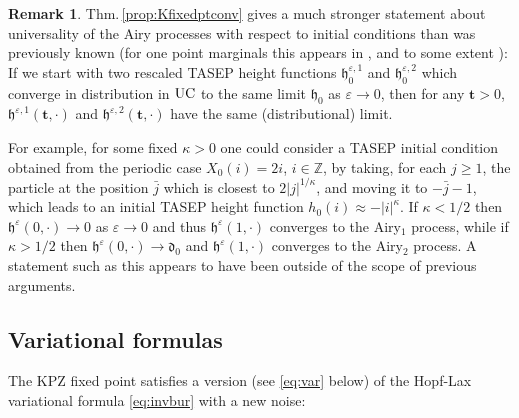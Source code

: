 \documentclass[letterpaper,reqno,11pt,oneside,final]{amsart}
\theoremstyle{definition}
\newtheorem{rem}[thm]{Remark}
\newcommand{\fh}{\mathfrak{h}}
\newcommand{\zz}{\mathbb{Z}}
\newcommand{\ep}{\varepsilon}
\newcommand{\uptext}[1]{\text{\upshape{#1}}}
\DeclareMathOperator{\UC}{\uptext{UC}}
\newcommand{\ft}{\mathbf{t}}
\numberwithin{equation}{section}
\begin{document}
\begin{rem}
Thm.\,\ref{prop:Kfixedptconv} gives a much stronger statement about universality of the Airy processes with respect to initial conditions than was previously known (for one point marginals this appears in \cite{corwinLiuWang}, and to some extent \cite{flat}):
If we start with two rescaled TASEP height functions $\fh_0^{\ep,1}$ and $\fh_0^{\ep,2}$ which converge in distribution in $\UC$ to the same limit $\fh_0$ as $\ep\to0$, then for any $\ft>0$, $\fh^{\ep,1}(\ft,\cdot)$ and $\fh^{\ep,2}(\ft,\cdot)$ have the same (distributional) limit.

\noindent For example, for some fixed $\kappa>0$ one could consider a TASEP initial condition obtained from the periodic case $X_0(i)=2i$, $i\in\zz$, by taking, for each $j\geq1$, the particle at the position $\bar j$ which is closest to $2|j|^{1/\kappa}$, and moving it to $-\bar j-1$, which leads to an initial TASEP height function $h_0(i)\approx-|i|^\kappa$.
If $\kappa<1/2$ then $\fh^\ep(0,\cdot)\longrightarrow0$ as $\ep\to0$ and thus $\fh^\ep(1,\cdot)$ converges to the Airy$_1$ process, while if $\kappa>1/2$ then $\fh^\ep(0,\cdot)\longrightarrow\mathfrak{d}_0$ and $\fh^\ep(1,\cdot)$ converges to the Airy$_2$ process.
A statement such as this appears to have been outside of the scope of previous arguments.
\end{rem}

\subsection{Variational formulas}  

The KPZ fixed point satisfies a version (see \eqref{eq:var} below) of the Hopf-Lax variational formula \eqref{eq:invbur}
with a new noise:
\end{document}
